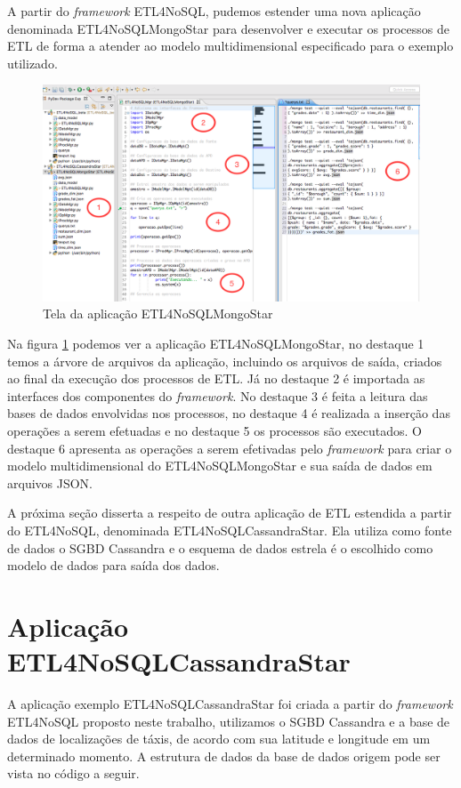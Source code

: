 A partir do \textit{framework} ETL4NoSQL, pudemos estender uma nova aplicação denominada ETL4NoSQLMongoStar para desenvolver e executar os processos de ETL de forma a atender ao modelo multidimensional especificado para o exemplo utilizado.

\begin{figure}[h!]
	\centering
	\includegraphics[scale=0.4]{fig/ETL4NoSQLMongoStar.png}
	\caption{Tela da aplicação ETL4NoSQLMongoStar}
	\label{etl4nosqlmongostar}
\end{figure}

Na figura \ref{etl4nosqlmongostar} podemos ver a aplicação ETL4NoSQLMongoStar, no destaque 1 temos a árvore de arquivos da aplicação, incluindo os arquivos de saída, criados ao final da execução dos processos de ETL. Já no destaque 2 é importada as interfaces dos componentes do \textit{framework}. No destaque 3 é feita a leitura das bases de dados envolvidas nos processos, no destaque 4 é realizada a inserção das operações a serem efetuadas e no destaque 5 os processos são executados. O destaque 6 apresenta as operações a serem efetivadas pelo \textit{framework} para criar o modelo multidimensional do ETL4NoSQLMongoStar e sua saída de dados em arquivos JSON.

A próxima seção disserta a respeito de outra aplicação de ETL estendida a partir do ETL4NoSQL, denominada ETL4NoSQLCassandraStar. Ela utiliza como fonte de dados o SGBD Cassandra e o esquema de dados estrela é o escolhido como modelo de dados para saída dos dados.


\section{Aplicação ETL4NoSQLCassandraStar}

A aplicação exemplo ETL4NoSQLCassandraStar foi criada a partir do \textit{framework} ETL4NoSQL proposto neste trabalho, utilizamos o SGBD Cassandra e a base de dados de localizações de táxis, de acordo com sua latitude e longitude em um determinado momento. A estrutura de dados da base de dados origem pode ser vista no código a seguir.

